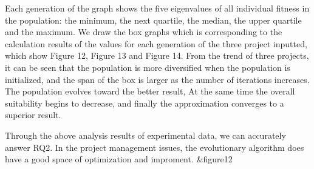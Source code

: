 Each generation of the graph shows the five eigenvalues of all individual 
fitness in the population: the minimum, the next quartile, the median, the 
upper quartile and the maximum. We draw the box graphs which is corresponding 
to the calculation results of the values for each generation of the three 
project inputted, which show Figure 12, Figure 13 and Figure 14. From the 
trend of three projects, it can be seen that the population is more 
diversified when the population is initialized, and the span of the box is 
larger as the number of iterations increases. The population evolves toward 
the better result, At the same time the overall suitability begins to 
decrease, and finally the approximation converges to a superior result.

Through the above analysis results of experimental data, we can accurately 
answer RQ2. In the project management issues, the evolutionary algorithm does 
have a good space of optimization and improment.
&figure12



